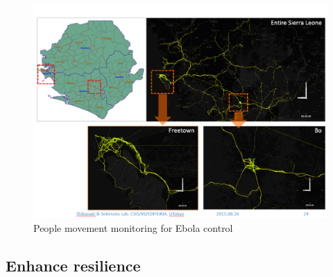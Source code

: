 \begin{figure}[H]
\begin{center}
\includegraphics[width = 0.8\linewidth]{Figures/ebola.png}
\end{center}
\caption{People movement monitoring for Ebola control}
\label{ebola}
\end{figure}



\subsection{Enhance resilience}

